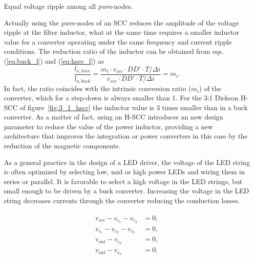 
Equal voltage ripple among all \emph{pwm}-nodes.

Actually using the \emph{pwm}-nodes of an SCC reduces the amplitude of the voltage ripple at the filter inductor, what at the same time requires a smaller inductor value for a converter operating under the same frequency and current ripple conditions. The reduction ratio of the inductor can be obtained from eqs. (\ref{eq:buck_l}) and (\ref{eq:hscc_l}) as
\begin{equation}
 \frac{l_{o,hscc}}{l_{o,buck}} =  \frac{{ m_i \cdot v_{src} \cdot DD' \cdot T}/{\Delta i} }{{  v_{src} \cdot DD' \cdot T}/{\Delta i}} = m_i.
\label{eq:l_m}
\end{equation}
In fact, the ratio coincides with the intrinsic conversion ratio ($m_i$) of the converter, which for a step-down is always smaller than 1. For the 3:1 Dickson H-SCC of figure~\ref{fig:3_1_hscc} the inductor value is 3 times smaller than in a buck converter. As a matter of fact, using an H-SCC introduces an new design parameter to reduce the value of the power inductor, providing a new architecture that improves the integration or power converters in this case by the reduction of the magnetic components.


As a general practice in the design of a LED driver, the voltage of
the LED string is often optimized by selecting low, mid or high
power LEDs and wiring them in series or parallel. It is favorable
to select a high voltage in the LED strings, but small enough to be
driven by a buck converter. Increasing the voltage in the LED
string decreases currents through the converter reducing the
conduction losses.

\begin{align}
\begin{split}
  v_{src} - v_{c_1} - v_{c_2} &=0, \\
  v_{c_1} - v_{c_2} - v_{c_3} &=0, \\
  v_{out} - v_{c_2}  &=0,\\
  v_{out} - v_{c_3}  &=0,
\end{split}
\end{align}


